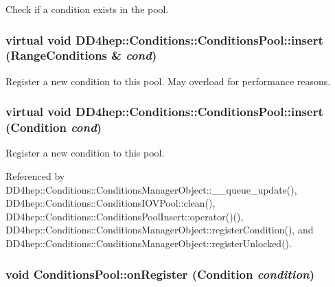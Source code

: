 Check if a condition exists in the pool. \hypertarget{class_d_d4hep_1_1_conditions_1_1_conditions_pool_a0acc07312e725ef5fb80e0de276b501e}{
\subsubsection[{insert}]{\setlength{\rightskip}{0pt plus 5cm}virtual void DD4hep::Conditions::ConditionsPool::insert ({\bf RangeConditions} \& {\em cond})}}
\label{class_d_d4hep_1_1_conditions_1_1_conditions_pool_a0acc07312e725ef5fb80e0de276b501e}


Register a new condition to this pool. May overload for performance reasons. \hypertarget{class_d_d4hep_1_1_conditions_1_1_conditions_pool_a90abd47fd41d04d96b180aa244786b01}{
\subsubsection[{insert}]{\setlength{\rightskip}{0pt plus 5cm}virtual void DD4hep::Conditions::ConditionsPool::insert ({\bf Condition} {\em cond})}}
\label{class_d_d4hep_1_1_conditions_1_1_conditions_pool_a90abd47fd41d04d96b180aa244786b01}


Register a new condition to this pool. 

Referenced by DD4hep::Conditions::ConditionsManagerObject::\_\-\_\-queue\_\-update(), DD4hep::Conditions::ConditionsIOVPool::clean(), DD4hep::Conditions::ConditionsPoolInsert::operator()(), DD4hep::Conditions::ConditionsManagerObject::registerCondition(), and DD4hep::Conditions::ConditionsManagerObject::registerUnlocked().\hypertarget{class_d_d4hep_1_1_conditions_1_1_conditions_pool_aac40c7730b4ef3cb08253c98a6d79ee2}{
\subsubsection[{onRegister}]{\setlength{\rightskip}{0pt plus 5cm}void ConditionsPool::onRegister ({\bf Condition} {\em condition})}}
\label{class_d_d4hep_1_1_conditions_1_1_conditions_pool_aac40c7730b4ef3cb08253c98a6d79ee2}


